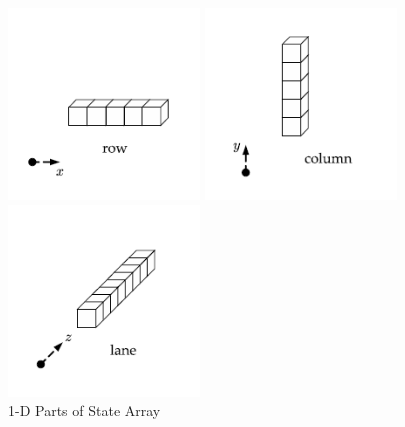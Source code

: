 \documentclass[12pt,a4paper,oneside]{report}
\begin{document}
\begin{figure}[H]
\begin{minipage}[t]{0.3\linewidth} 
\centering 
\includegraphics[width=2in]{imgs/1D1.png} 
\end{minipage}
\begin{minipage}[t]{0.3\linewidth} 
\centering 
\includegraphics[width=2in]{imgs/1D2.png} 
\end{minipage}
\begin{minipage}[t]{0.3\linewidth} 
\centering 
\includegraphics[width=2in]{imgs/1D3.png} 
\end{minipage}
\caption{1-D Parts of State Array} 
\end{figure}
\end{document}
